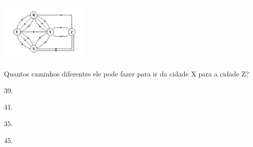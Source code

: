
\includegraphics[width=1.68348in,height=1.18344in]{media/image141.png}

Quantos caminhos diferentes ele pode fazer para ir da cidade X para a
cidade Z?

\begin{escolha}
\item
  39.
\item
  41.
\item
  35.
\item
  45.
\end{escolha}


